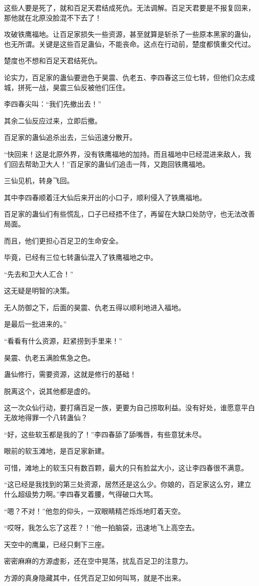 \begin{this_body}
这些人要是死了，就和百足天君结成死仇。无法调解。百足天君要是不报复回来，那他就在北原没脸混不下去了！

攻破铁鹰福地。让百足家损失一些资源，甚至就算是斩杀了一些原本黑家的蛊仙，也无所谓。关键是这些百足蛊仙，不能丧命。这点在行动前，楚度都慎重交代过。

楚度也不想和百足天君结死仇。

论实力，百足家的蛊仙要逊色于昊震、仇老五、李四春这三位七转，但他们众志成城，拼死一战，昊震三仙反被他们压住。

李四春尖叫：“我们先撤出去！”

其余二仙反应过来，立即后撤。

百足家的蛊仙追杀出去，三仙迅速分散开。

“快回来！这是北原外界，没有铁鹰福地的加持。而且福地中已经混进来敌人，我们回去帮助卫大人！”百足家的蛊仙们追击一阵，又跑回铁鹰福地。

三仙见机，转身飞回。

其中李四春顺着汪大仙后来开出的小口子，顺利侵入了铁鹰福地。

百足家的蛊仙们有些慌乱，口子已经捂不住了，再留在大缺口处防守，也无法改善局面。

而且，他们更担心百足卫的生命安全。

毕竟，已经有三位七转蛊仙混入了铁鹰福地之中。

“先去和卫大人汇合！”

这无疑是明智的决策。

无人防御之下，后面的昊震、仇老五得以顺利地进入福地。

是最后一批进来的。”

“看看有什么资源，赶紧捞到手里来！”

昊震、仇老五满脸焦急之色。

蛊仙修行，需要资源，这就是修行的基础！

脱离这个，说其他都是虚的。

这一次众仙行动，要打痛百足一族，更要为自己捞取利益。没有好处，谁愿意平白无故地得罪一个八转蛊仙？

“好，这些软玉都是我的了！”李四春舔了舔嘴唇，有些意犹未尽。

眼前的软玉滩地，是百足家新建。

可惜，滩地上的软玉只有数百颗，最大的只有脸盆大小，这让李四春很不满意。

“这已经是我找到的第三处资源，居然还是这么少。你娘的，百足家这么穷，建立什么超级势力啊。”李四春叉着腰，气得破口大骂。

“嗯？不对！”他忽的仰头，一双眼睛精芒烁烁地盯着天空。

“哎呀，我怎么忘了这茬？！”他一拍脑袋，迅速地飞上高空去。

天空中的鹰巢，已经只剩下三座。

密密麻麻的方源虚影，还在空中晃荡，扰乱百足卫的注意力。

方源的真身隐藏其中，任凭百足卫如何叫骂，就是不出来。

\end{this_body}

